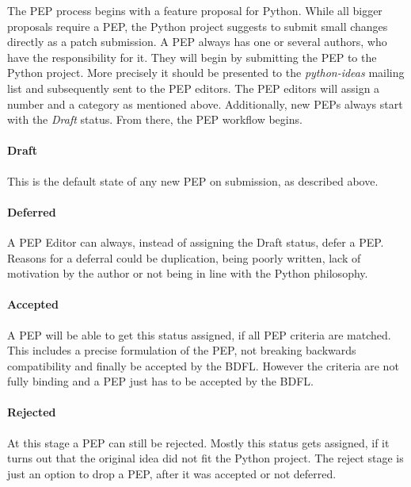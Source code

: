 The \ac{PEP} process begins with a feature proposal for Python. While all
bigger proposals require a \ac{PEP}, the Python project suggests to submit
small changes directly as a patch submission. A \ac{PEP} always has one or
several authors, who have the responsibility for it. They will begin by
submitting the \ac{PEP} to the Python project. More precisely it should be
presented to the \emph{python-ideas} mailing list and subsequently sent to the
\ac{PEP} editors. The \ac{PEP} editors will assign a number and a category as
mentioned above. Additionally, new \acp{PEP} always start with the \emph{Draft}
status. From there, the \ac{PEP} workflow begins.

\paragraph{Draft}

This is the default state of any new \ac{PEP} on submission, as described
above.

\paragraph{Deferred}

A \ac{PEP} Editor can always, instead of assigning the Draft status, defer a
\ac{PEP}. Reasons for a deferral could be duplication, being poorly written,
lack of motivation by the author or not being in line with the Python
philosophy.

\paragraph{Accepted}

A \ac{PEP} will be able to get this status assigned, if all \ac{PEP} criteria
are matched. This includes a precise formulation of the \ac{PEP}, not breaking
backwards compatibility and finally be accepted by the \ac{BDFL}. However the
criteria are not fully binding and a \ac{PEP} just has to be accepted by the
\ac{BDFL}.

\paragraph{Rejected}

At this stage a \ac{PEP} can still be rejected. Mostly this status gets
assigned, if it turns out that the original idea did not fit the Python
project. The reject stage is just an option to drop a \ac{PEP}, after it was
accepted or not deferred.

